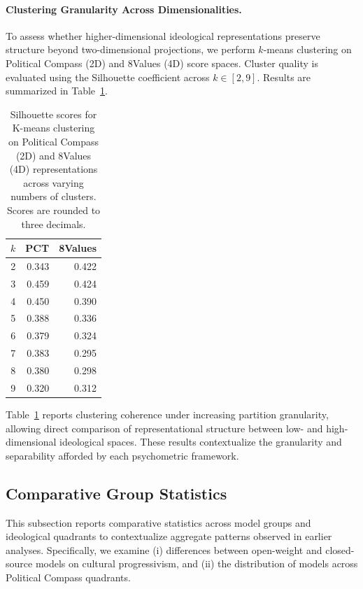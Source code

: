 \documentclass[11pt]{article}
\begin{document}
\paragraph{Clustering Granularity Across Dimensionalities.}
To assess whether higher-dimensional ideological representations preserve structure beyond two-dimensional projections, we perform $k$-means clustering on Political Compass (2D) and 8Values (4D) score spaces. Cluster quality is evaluated using the Silhouette coefficient across $k \in [2,9]$. Results are summarized in Table~\ref{tab:silhouette_scores}.

\begin{table}[t]
\centering
\setlength{\tabcolsep}{7pt}
\begin{tabular}{c r r}
\toprule
\textbf{$k$} & \textbf{PCT} & \textbf{8Values} \\
\midrule
2 & 0.343 & 0.422 \\
3 & 0.459 & 0.424 \\
4 & 0.450 & 0.390 \\
5 & 0.388 & 0.336 \\
6 & 0.379 & 0.324 \\
7 & 0.383 & 0.295 \\
8 & 0.380 & 0.298 \\
9 & 0.320 & 0.312 \\
\bottomrule
\end{tabular}
\caption{Silhouette scores for K-means clustering on Political Compass (2D) and 8Values (4D) representations across varying numbers of clusters. Scores are rounded to three decimals.}
\label{tab:silhouette_scores}
\end{table}

Table~\ref{tab:silhouette_scores} reports clustering coherence under increasing partition granularity, allowing direct comparison of representational structure between low- and high-dimensional ideological spaces. These results contextualize the granularity and separability afforded by each psychometric framework.




\subsection{Comparative Group Statistics}
\label{app:comparative-groups}

This subsection reports comparative statistics across model groups and ideological quadrants to contextualize aggregate patterns observed in earlier analyses. Specifically, we examine (i) differences between open-weight and closed-source models on cultural progressivism, and (ii) the distribution of models across Political Compass quadrants.
\end{document}
